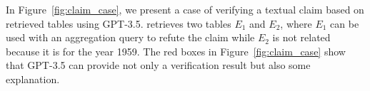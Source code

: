 In Figure~\ref{fig:claim_case}, we present a case of verifying a textual claim based on retrieved tables using GPT-3.5. \sys retrieves two tables $E_1$ and $E_2$, where $E_1$ can be used with an aggregation query to refute the claim while $E_2$ is not related because it is for the year 1959. The red boxes in Figure~\ref{fig:claim_case} show that GPT-3.5 can provide not only a verification result but also some explanation.




